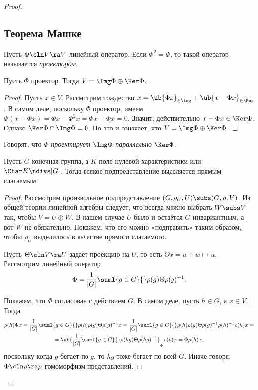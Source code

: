 \documentclass[a4paper]{article}
\newcommand{\sumlg}{\suml{g \in G}{}}
\begin{document}
\begin{proof}
\subsection{Теорема Машке}

\begin{df}
Пусть $\Phi\cln V \ra V$ линейный оператор. Если $\Phi^2=\Phi$, то такой оператор  называется
\emph{проектором}.
\end{df}

\begin{theorem}
Пусть $\Phi$ проектор. Тогда $V = \Img \Phi \oplus \Ker \Phi$.
\end{theorem}
\begin{proof}
Пусть $x \in V$. Рассмотрим тождество $x = \ub{\Phi x}_{\in \Img} + \ub{x - \Phi x}_{\in \Ker}$. В  самом
деле, поскольку $\Phi$ проектор, имеем $\Phi(x-\Phi x) = \Phi x - \Phi^2 x = \Phi x - \Phi x = 0$. Значит,
действительно $x - \Phi x \in \Ker \Phi$. Однако $\Ker \Phi \cap \Img \Phi = 0$. Но это и означает, что $V =
\Img \Phi \oplus \Ker \Phi$.
\end{proof}

Говорят, что $\Phi$ \emph{проектирует} $\Img \Phi$ \emph{параллельно} $\Ker \Phi$.

\begin{theorem}
Пусть $G$ конечная группа, а $K$ поле нулевой характеристики или $\Char K \ndivs |G|$.  Тогда всякое
подпредставление выделяется прямым слагаемым.
\end{theorem}
\begin{proof}
Рассмотрим произвольное подпредставление $(G, \rho_U, U) \subs (G, \rho, V)$. Из общей  теории линейной
алгебры следует, что всегда можно выбрать $W \subs V$ так, чтобы $V = U \oplus W$. В нашем случае $U$ было и
остаётся $G$ инвариантным, а вот $W$ не обязательно. Покажем, что его можно «подправить» таким образом,
чтобы $\rho_U$ выделилось в качестве прямого слагаемого.

Пусть $\Theta\cln V \ra U$ задаёт проекцию на $U$, то есть $\Theta x = u + w \mapsto u$.  Рассмотрим линейный
оператор
$$
  \Phi = \frac{1}{|G|}\sumlg \rho(g) \Theta \rho(g)^{-1}.
$$

Покажем, что $\Phi$ согласован с действием $G$. В самом деле, пусть $h \in G$, а $x \in V$. Тогда
\begin{multline*}
\rho(h)\Phi x = \frac{1}{|G|}\sumlg \rho(h)\rho(g)\Theta \rho(g)^{-1} x=
\frac{1}{|G|}\sumlg \rho(h)\rho(g)\Theta \rho(g)^{-1}\rho(h)^{-1}\rho(h) x=\\
=\ub{\frac{1}{|G|}\sumlg \rho(hg)\Theta \rho(hg)^{-1}}_{\Phi}\rho(h)x = \Phi\rho(h)x,
\end{multline*}
поскольку когда $g$ бегает по $g$, то $hg$ тоже бегает по всей $G$. Иначе говоря, $\Phi\cln \rho \ra \rho$
гомоморфизм представлений.


\end{proof}
\end{proof}
\end{document}
